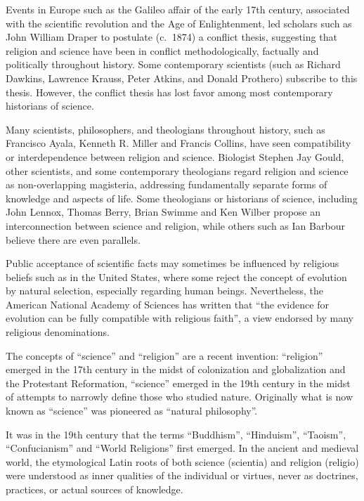 Events in Europe such as the Galileo affair of the early 17th century, associated with the scientific revolution and the Age of Enlightenment, led scholars such as John William Draper to postulate (c.  1874) a conflict thesis, suggesting that religion and science have been in conflict methodologically, factually and politically throughout history. Some contemporary scientists (such as Richard Dawkins, Lawrence Krauss, Peter Atkins, and Donald Prothero) subscribe to this thesis. However, the conflict thesis has lost favor among most contemporary historians of science.

Many scientists, philosophers, and theologians throughout history, such as Francisco Ayala, Kenneth R. Miller and Francis Collins, have seen compatibility or interdependence between religion and science. Biologist Stephen Jay Gould, other scientists, and some contemporary theologians regard religion and science as non-overlapping magisteria, addressing fundamentally separate forms of knowledge and aspects of life. Some theologians or historians of science, including John Lennox, Thomas Berry, Brian Swimme and Ken Wilber propose an interconnection between science and religion, while others such as Ian Barbour believe there are even parallels.

Public acceptance of scientific facts may sometimes be influenced by religious beliefs such as in the United States, where some reject the concept of evolution by natural selection, especially regarding human beings. Nevertheless, the American National Academy of Sciences has written that ``the evidence for evolution can be fully compatible with religious faith'', a view endorsed by many religious denominations.

The concepts of ``science'' and ``religion'' are a recent invention: ``religion'' emerged in the 17th century in the midst of colonization and globalization and the Protestant Reformation, ``science'' emerged in the 19th century in the midst of attempts to narrowly define those who studied nature. Originally what is now known as ``science'' was pioneered as ``natural philosophy''.

It was in the 19th century that the terms ``Buddhism'', ``Hinduism'', ``Taoism'', ``Confucianism'' and ``World Religions'' first emerged. In the ancient and medieval world, the etymological Latin roots of both science (scientia) and religion (religio) were understood as inner qualities of the individual or virtues, never as doctrines, practices, or actual sources of knowledge.

